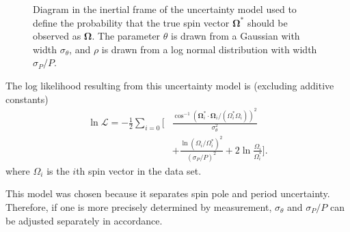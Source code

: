 \documentclass[fleqn,usenatbib]{mnras}
\newcommand{\unit}[1]{\bm{\hat{#1}}}
\newcommand{\parens}[1]{\left( #1 \right)}
\begin{document}
\begin{figure}
  \centering
  \caption{Diagram in the inertial frame of the uncertainty model used to define the probability that the true spin vector $\bm \Omega^*$ should be observed as $\bm \Omega$. The parameter $\theta$ is drawn from a Gaussian with width $\sigma_\theta$, and $\rho$ is drawn from a log normal distribution with width $\sigma_P/P$.}
  \label{fig:uncertainty-model}
\end{figure}

The log likelihood resulting from this uncertainty model is (excluding additive constants)
\begin{equation}
  \begin{split}
  \ln \mathcal{L} = -\frac{1}{2}\sum_{i = 0}\Bigg[&\frac{\cos^{-1} (\bm \Omega_i^* \cdot \bm \Omega_i/(\Omega_i^* \Omega_i))^2}{\sigma_\theta^2}\\
  &+\frac{\ln \parens{\Omega_i /\Omega_i^*}^2}{(\sigma_P / P)^2} + 2\ln\frac{\Omega_i}{\Omega_i^*}\Bigg].
  \end{split}
  \label{eqn:log-likelihood}
\end{equation}
where $\Omega_i$ is the $i$th spin vector in the data set.

This model was chosen because it separates spin pole and period uncertainty. Therefore, if one is more precisely determined by measurement, $\sigma_\theta$ and $\sigma_P / P$ can be adjusted separately in accordance.
\end{document}
